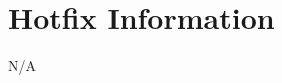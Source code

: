 \begingroup
\renewcommand{\cleardoublepage}{}
\renewcommand{\clearpage}{\par}
\chapter{Hotfix Information}
\endgroup
N/A